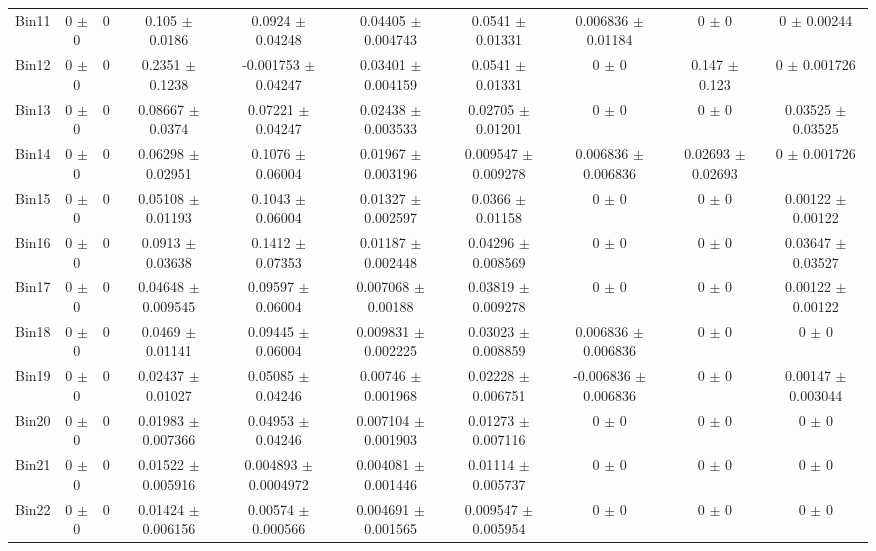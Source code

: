 \begin{tabular}{@{\extracolsep{4pt}}lccccccccc@{}}
     Bin11 & 0 $\pm$ 0 & 0 & 0.105 $\pm$ 0.0186 & 0.0924 $\pm$ 0.04248 & 0.04405 $\pm$ 0.004743 & 0.0541 $\pm$ 0.01331 & 0.006836 $\pm$ 0.01184 & 0 $\pm$ 0 & 0 $\pm$ 0.00244 \\ 
     Bin12 & 0 $\pm$ 0 & 0 & 0.2351 $\pm$ 0.1238 & -0.001753 $\pm$ 0.04247 & 0.03401 $\pm$ 0.004159 & 0.0541 $\pm$ 0.01331 & 0 $\pm$ 0 & 0.147 $\pm$ 0.123 & 0 $\pm$ 0.001726 \\ 
     Bin13 & 0 $\pm$ 0 & 0 & 0.08667 $\pm$ 0.0374 & 0.07221 $\pm$ 0.04247 & 0.02438 $\pm$ 0.003533 & 0.02705 $\pm$ 0.01201 & 0 $\pm$ 0 & 0 $\pm$ 0 & 0.03525 $\pm$ 0.03525 \\ 
     Bin14 & 0 $\pm$ 0 & 0 & 0.06298 $\pm$ 0.02951 & 0.1076 $\pm$ 0.06004 & 0.01967 $\pm$ 0.003196 & 0.009547 $\pm$ 0.009278 & 0.006836 $\pm$ 0.006836 & 0.02693 $\pm$ 0.02693 & 0 $\pm$ 0.001726 \\ 
     Bin15 & 0 $\pm$ 0 & 0 & 0.05108 $\pm$ 0.01193 & 0.1043 $\pm$ 0.06004 & 0.01327 $\pm$ 0.002597 & 0.0366 $\pm$ 0.01158 & 0 $\pm$ 0 & 0 $\pm$ 0 & 0.00122 $\pm$ 0.00122 \\ 
     Bin16 & 0 $\pm$ 0 & 0 & 0.0913 $\pm$ 0.03638 & 0.1412 $\pm$ 0.07353 & 0.01187 $\pm$ 0.002448 & 0.04296 $\pm$ 0.008569 & 0 $\pm$ 0 & 0 $\pm$ 0 & 0.03647 $\pm$ 0.03527 \\ 
     Bin17 & 0 $\pm$ 0 & 0 & 0.04648 $\pm$ 0.009545 & 0.09597 $\pm$ 0.06004 & 0.007068 $\pm$ 0.00188 & 0.03819 $\pm$ 0.009278 & 0 $\pm$ 0 & 0 $\pm$ 0 & 0.00122 $\pm$ 0.00122 \\ 
     Bin18 & 0 $\pm$ 0 & 0 & 0.0469 $\pm$ 0.01141 & 0.09445 $\pm$ 0.06004 & 0.009831 $\pm$ 0.002225 & 0.03023 $\pm$ 0.008859 & 0.006836 $\pm$ 0.006836 & 0 $\pm$ 0 & 0 $\pm$ 0 \\ 
     Bin19 & 0 $\pm$ 0 & 0 & 0.02437 $\pm$ 0.01027 & 0.05085 $\pm$ 0.04246 & 0.00746 $\pm$ 0.001968 & 0.02228 $\pm$ 0.006751 & -0.006836 $\pm$ 0.006836 & 0 $\pm$ 0 & 0.00147 $\pm$ 0.003044 \\ 
     Bin20 & 0 $\pm$ 0 & 0 & 0.01983 $\pm$ 0.007366 & 0.04953 $\pm$ 0.04246 & 0.007104 $\pm$ 0.001903 & 0.01273 $\pm$ 0.007116 & 0 $\pm$ 0 & 0 $\pm$ 0 & 0 $\pm$ 0 \\ 
     Bin21 & 0 $\pm$ 0 & 0 & 0.01522 $\pm$ 0.005916 & 0.004893 $\pm$ 0.0004972 & 0.004081 $\pm$ 0.001446 & 0.01114 $\pm$ 0.005737 & 0 $\pm$ 0 & 0 $\pm$ 0 & 0 $\pm$ 0 \\ 
     Bin22 & 0 $\pm$ 0 & 0 & 0.01424 $\pm$ 0.006156 & 0.00574 $\pm$ 0.000566 & 0.004691 $\pm$ 0.001565 & 0.009547 $\pm$ 0.005954 & 0 $\pm$ 0 & 0 $\pm$ 0 & 0 $\pm$ 0 \\ 

\end{tabular}
